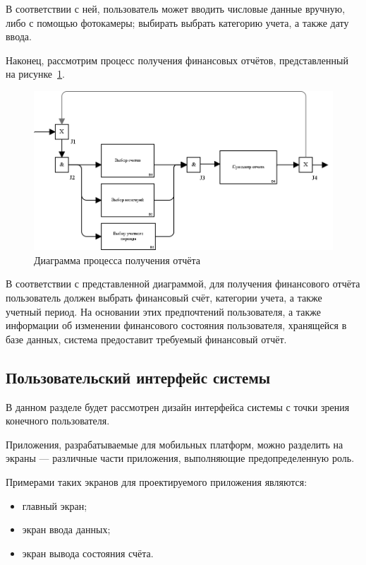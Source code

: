В соответствии с ней, пользователь может вводить числовые данные
вручную, либо с помощью фотокамеры; выбирать выбрать категорию учета,
а также дату ввода.


\pagebreak
Наконец, рассмотрим процесс получения финансовых отчётов,
представленный на рисунке~\ref{fig:idef3_reports}.

\begin{figure}[h!]
  \centering
  \includegraphics[width=150mm]{pic/idef3_reports}
  \caption{Диаграмма процесса получения отчёта}
  \label{fig:idef3_reports}
\end{figure}

В соответствии с представленной диаграммой, для получения
финансового отчёта пользователь должен выбрать финансовый счёт,
категории учета, а также учетный период.
На основании этих предпочтений пользователя, а также информации
об изменении финансового состояния пользователя,
хранящейся в базе данных, система предоставит требуемый финансовый отчёт.

\pagebreak
\subsection{Пользовательский интерфейс системы}

В данном разделе будет рассмотрен дизайн интерфейса системы с точки зрения
конечного пользователя.

Приложения, разрабатываемые для мобильных платформ, можно разделить
на экраны --- различные части приложения, выполняющие предопределенную роль.

Примерами таких экранов для проектируемого приложения являются:
\begin{itemize}
\item главный экран;
\item экран ввода данных;
\item экран вывода состояния счёта.
\end{itemize}

